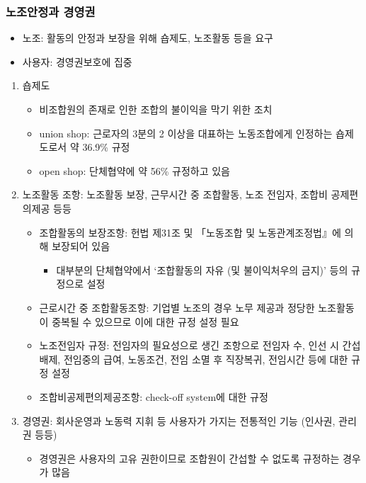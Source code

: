 \documentclass[aspectratio=169,xcolor=dvipsnames,handout]{beamer}
\begin{document}
\begin{frame}[allowframebreaks]
    \frametitle{노조안정과 경영권}
    \begin{itemize}[<+->]
        \item 노조: 활동의 안정과 보장을 위해 숍제도, 노조활동 등을 요구
        \item 사용자: 경영권보호에 집중
    \end{itemize}
    \begin{enumerate}[<+->]
    \item 숍제도
        \begin{itemize}[<+->]
            \item 비조합원의 존재로 인한 조합의 불이익을 막기 위한 조치
            \item union shop: 근로자의 3분의 2 이상을 대표하는 노동조합에게 인정하는 숍제도로서 약 36.9\% 규정 
            \item open shop: 단체협약에 약 56\% 규정하고 있음 
        \end{itemize}
    \framebreak\relax
    \item 노조활동 조항: 노조활동 보장, 근무시간 중 조합활동, 노조 전임자, 조합비 공제편의제공 등등
        \begin{itemize}[<+->]
            \item 조합활동의 보장조항: 헌법 제31조 및 「노동조합 및 노동관계조정법』에 의해 보장되어 있음
            \begin{itemize}[<+->]
                \item 대부분의 단체협약에서 `조합활동의 자유 (및 불이익처우의 금지)' 등의 규정으로 설정
            \end{itemize}
            \item 근로시간 중 조합활동조항: 기업별 노조의 경우 노무 제공과 정당한 노조활동이 중복될 수 있으므로 이에 대한 규정 설정 필요
            \item 노조전임자 규정: 전임자의 필요성으로 생긴 조항으로 전임자 수, 인선 시 간섭 배제, 전임중의 급여, 노동조건, 전임 소멸 후 직장복귀, 전임시간 등에 대한 규정 설정
            \item 조합비공제편의제공조항: check-off system에 대한 규정
        \end{itemize}
    \item 경영권: 회사운영과 노동력 지휘 등 사용자가 가지는 전통적인 기능 (인사권, 관리권 등등)
        \begin{itemize}[<+->]
            \item 경영권은 사용자의 고유 권한이므로 조합원이 간섭할 수 없도록 규정하는 경우가 많음
        \end{itemize}
    \end{enumerate}
\end{frame}
\end{document}
